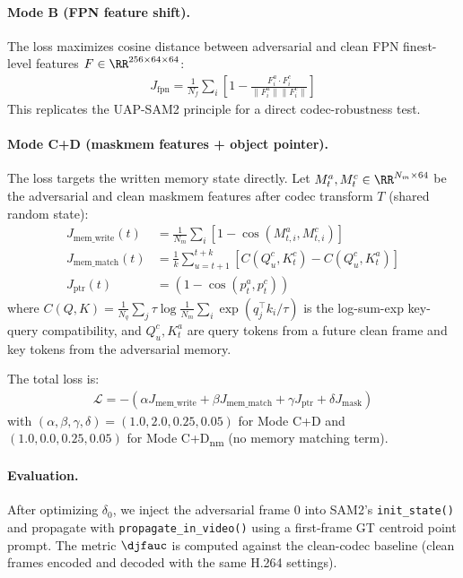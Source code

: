 \paragraph{Mode B (FPN feature shift).}
The loss maximizes cosine distance between adversarial and clean FPN finest-level features $F \in \RR^{256 \times 64 \times 64}$:
\begin{align}
  J_\text{fpn} = \frac{1}{N_f} \sum_i \left[1 - \frac{F^a_i \cdot F^c_i}{\|F^a_i\|\|F^c_i\|}\right]
\end{align}
This replicates the UAP-SAM2 principle for a direct codec-robustness test.

\paragraph{Mode C+D (maskmem features + object pointer).}
The loss targets the written memory state directly. Let $M_t^a, M_t^c \in \RR^{N_m \times 64}$ be the adversarial and clean maskmem features after codec transform $T$ (shared random state):
\begin{align}
  J_\text{mem\_write}(t) &= \frac{1}{N_m} \sum_i \left[1 - \cos(M_{t,i}^a, M_{t,i}^c)\right] \\
  J_\text{mem\_match}(t) &= \frac{1}{k} \sum_{u=t+1}^{t+k} \left[C(Q_u^c, K_t^c) - C(Q_u^c, K_t^a)\right] \\
  J_\text{ptr}(t) &= (1 - \cos(p_t^a, p_t^c))
\end{align}
where $C(Q, K) = \frac{1}{N_q}\sum_j \tau \log\frac{1}{N_m}\sum_i \exp(q_j^\top k_i / \tau)$ is the log-sum-exp key-query compatibility, and $Q_u^c, K_t^a$ are query tokens from a future clean frame and key tokens from the adversarial memory.

The total loss is:
\begin{align}
  \mathcal{L} = -(\alpha J_\text{mem\_write} + \beta J_\text{mem\_match} + \gamma J_\text{ptr} + \delta J_\text{mask})
\end{align}
with $(\alpha, \beta, \gamma, \delta) = (1.0, 2.0, 0.25, 0.05)$ for Mode C+D and $(1.0, 0.0, 0.25, 0.05)$ for Mode C+D\textsubscript{nm} (no memory matching term).

\paragraph{Evaluation.}
After optimizing $\delta_0$, we inject the adversarial frame 0 into SAM2's \texttt{init\_state()} and propagate with \texttt{propagate\_in\_video()} using a first-frame GT centroid point prompt. The metric $\djfauc$ is computed against the clean-codec baseline (clean frames encoded and decoded with the same H.264 settings).
